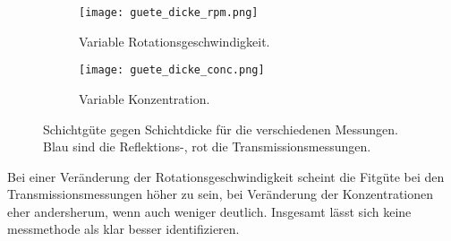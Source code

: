 \begin{figure}[h!]
  \centering
  \begin{subfigure}{.4\textwidth}
    \centering
    \texttt{[image: guete\_dicke\_rpm.png]}
    \caption{Variable Rotationsgeschwindigkeit.}
    \label{fig:guete_rpm}
  \end{subfigure}%
  \begin{subfigure}{.4\textwidth}
    \centering
    \texttt{[image: guete\_dicke\_conc.png]}
    \caption{Variable Konzentration.}
    \label{fig:guete_conc}
  \end{subfigure}
  \caption{Schichtgüte gegen Schichtdicke für die verschiedenen Messungen. Blau sind die Reflektions-, rot die Transmissionsmessungen.}
  \label{fig:guete_spektren}
\end{figure}

Bei einer Veränderung der Rotationsgeschwindigkeit scheint die Fitgüte bei den Transmissionsmessungen höher zu sein, bei Veränderung der Konzentrationen eher andersherum, wenn auch weniger deutlich. Insgesamt lässt sich keine messmethode als klar besser identifizieren.